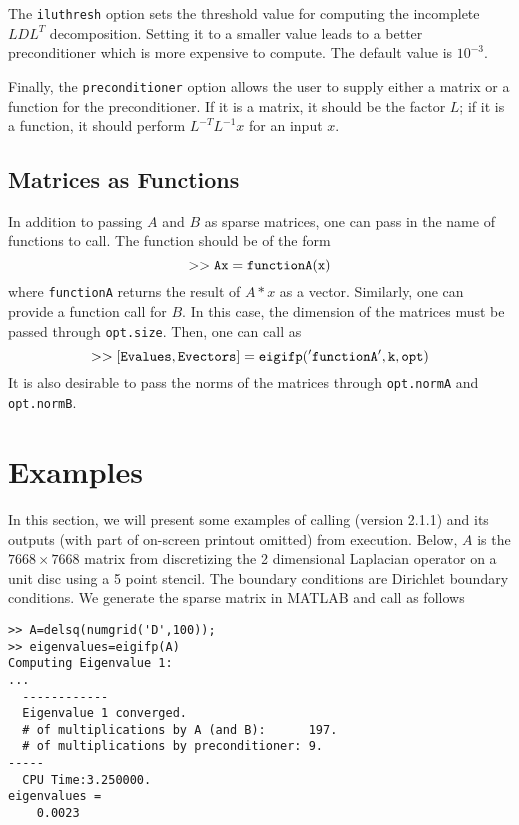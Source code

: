 \documentclass[acmtoms]{acmtrans2m}
\begin{document}
The {\tt iluthresh} option sets the threshold value for computing the incomplete $LDL^T$ decomposition.  Setting it to a smaller value leads 
to a better preconditioner which is more expensive to compute. 
The default value is $10^{-3}$.


Finally, the  {\tt preconditioner} option allows the user to supply 
either a matrix or a function  for the preconditioner. If it is a 
matrix, it should be the factor $L$; if it is a function, it should 
perform $L^{-T}L^{-1}x$ for an input $x$.  

\subsection{Matrices as Functions}
In addition to passing $A$ and $B$ as sparse matrices, one 
can pass in the name of functions to call. The function should be
of the form
\[
 {\tt >>Ax=functionA(x)}
\]
where {\tt functionA} returns the result of $A*x$ as a vector. Similarly, one can provide a function call for $B$. In this case, the dimension of 
the matrices must be passed through {\tt opt.size}. 
Then, one can call \eigifp as
\[
{\tt >>[Evalues,Evectors]=eigifp('functionA',k, opt)}
\]
It is also desirable to pass the norms of the matrices through 
{\tt opt.normA} and 
{\tt opt.normB}. 

\section{Examples}

In this section, we will present some examples of calling \eigifp 
(version 2.1.1) and its outputs (with part of on-screen printout  omitted)  
from  execution. 
Below,  $A$  is the $7668 \times 7668$ matrix from discretizing
the 2 dimensional Laplacian operator on a unit disc using a 5 point stencil. The boundary conditions
are Dirichlet boundary conditions. 
We generate the sparse matrix in MATLAB and call \eigifp as follows


\begin{verbatim}
>> A=delsq(numgrid('D',100));
>> eigenvalues=eigifp(A)
Computing Eigenvalue 1:
...
  ------------
  Eigenvalue 1 converged.
  # of multiplications by A (and B):      197.
  # of multiplications by preconditioner: 9.
-----
  CPU Time:3.250000.
eigenvalues =
    0.0023
\end{verbatim}
\end{document}
